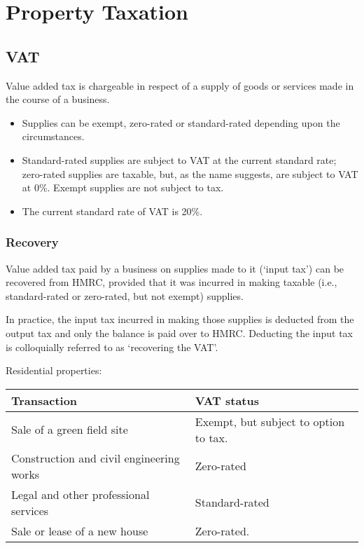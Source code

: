\documentclass[
]{article}
\providecommand{\tightlist}{%
  \setlength{\itemsep}{0pt}\setlength{\parskip}{0pt}}
\begin{document}
\hypertarget{property-taxation}{%
\section{Property Taxation}\label{property-taxation}}

\hypertarget{vat}{%
\subsection{VAT}\label{vat}}

Value added tax is chargeable in respect of a supply of goods or
services made in the course of a business.

\begin{itemize}
\tightlist
\item
  Supplies can be exempt, zero-rated or standard-rated depending upon
  the circumstances.
\item
  Standard-rated supplies are subject to VAT at the current standard
  rate; zero-rated supplies are taxable, but, as the name suggests, are
  subject to VAT at 0\%. Exempt supplies are not subject to tax.
\item
  The current standard rate of VAT is 20\%.
\end{itemize}

\hypertarget{recovery}{%
\subsubsection{Recovery}\label{recovery}}

Value added tax paid by a business on supplies made to it (`input tax')
can be recovered from HMRC, provided that it was incurred in making
taxable (i.e., standard-rated or zero-rated, but not exempt) supplies.

In practice, the input tax incurred in making those supplies is deducted
from the output tax and only the balance is paid over to HMRC. Deducting
the input tax is colloquially referred to as `recovering the VAT'.

Residential properties:

\begin{longtable}[]{@{}ll@{}}
\toprule()
Transaction & VAT status \\
\midrule()
\endhead
Sale of a green field site & Exempt, but subject to option to tax. \\
Construction and civil engineering works & Zero-rated \\
Legal and other professional services & Standard-rated \\
Sale or lease of a new house & Zero-rated. \\
\bottomrule()
\end{longtable}
\end{document}

